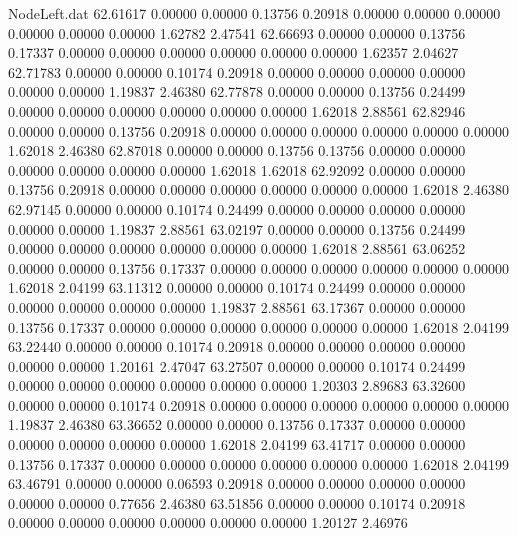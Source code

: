 \begin{filecontents}{NodeLeft.dat}
  62.61617    0.00000    0.00000     0.13756    0.20918    0.00000    0.00000    0.00000    0.00000    0.00000    0.00000    1.62782    2.47541
  62.66693    0.00000    0.00000     0.13756    0.17337    0.00000    0.00000    0.00000    0.00000    0.00000    0.00000    1.62357    2.04627
  62.71783    0.00000    0.00000     0.10174    0.20918    0.00000    0.00000    0.00000    0.00000    0.00000    0.00000    1.19837    2.46380
  62.77878    0.00000    0.00000     0.13756    0.24499    0.00000    0.00000    0.00000    0.00000    0.00000    0.00000    1.62018    2.88561
  62.82946    0.00000    0.00000     0.13756    0.20918    0.00000    0.00000    0.00000    0.00000    0.00000    0.00000    1.62018    2.46380
  62.87018    0.00000    0.00000     0.13756    0.13756    0.00000    0.00000    0.00000    0.00000    0.00000    0.00000    1.62018    1.62018
  62.92092    0.00000    0.00000     0.13756    0.20918    0.00000    0.00000    0.00000    0.00000    0.00000    0.00000    1.62018    2.46380
  62.97145    0.00000    0.00000     0.10174    0.24499    0.00000    0.00000    0.00000    0.00000    0.00000    0.00000    1.19837    2.88561
  63.02197    0.00000    0.00000     0.13756    0.24499    0.00000    0.00000    0.00000    0.00000    0.00000    0.00000    1.62018    2.88561
  63.06252    0.00000    0.00000     0.13756    0.17337    0.00000    0.00000    0.00000    0.00000    0.00000    0.00000    1.62018    2.04199
  63.11312    0.00000    0.00000     0.10174    0.24499    0.00000    0.00000    0.00000    0.00000    0.00000    0.00000    1.19837    2.88561
  63.17367    0.00000    0.00000     0.13756    0.17337    0.00000    0.00000    0.00000    0.00000    0.00000    0.00000    1.62018    2.04199
  63.22440    0.00000    0.00000     0.10174    0.20918    0.00000    0.00000    0.00000    0.00000    0.00000    0.00000    1.20161    2.47047
  63.27507    0.00000    0.00000     0.10174    0.24499    0.00000    0.00000    0.00000    0.00000    0.00000    0.00000    1.20303    2.89683
  63.32600    0.00000    0.00000     0.10174    0.20918    0.00000    0.00000    0.00000    0.00000    0.00000    0.00000    1.19837    2.46380
  63.36652    0.00000    0.00000     0.13756    0.17337    0.00000    0.00000    0.00000    0.00000    0.00000    0.00000    1.62018    2.04199
  63.41717    0.00000    0.00000     0.13756    0.17337    0.00000    0.00000    0.00000    0.00000    0.00000    0.00000    1.62018    2.04199
  63.46791    0.00000    0.00000     0.06593    0.20918    0.00000    0.00000    0.00000    0.00000    0.00000    0.00000    0.77656    2.46380
  63.51856    0.00000    0.00000     0.10174    0.20918    0.00000    0.00000    0.00000    0.00000    0.00000    0.00000    1.20127    2.46976
\end{filecontents}
